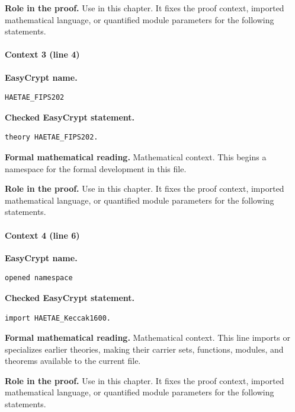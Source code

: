 \noindent\textbf{Role in the proof.}
Use in this chapter. It fixes the proof context, imported mathematical language, or quantified module parameters for the following statements.

\paragraph{Context 3 (line 4)}
\noindent\textbf{EasyCrypt name.}
\begin{lstlisting}[language=EasyCrypt,basicstyle=\ttfamily\scriptsize]
HAETAE_FIPS202
\end{lstlisting}
\noindent\textbf{Checked EasyCrypt statement.}
\begin{lstlisting}[language=EasyCrypt,basicstyle=\ttfamily\scriptsize]
theory HAETAE_FIPS202.
\end{lstlisting}
\noindent\textbf{Formal mathematical reading.}
Mathematical context. This begins a namespace for the formal development in this file.

\noindent\textbf{Role in the proof.}
Use in this chapter. It fixes the proof context, imported mathematical language, or quantified module parameters for the following statements.

\paragraph{Context 4 (line 6)}
\noindent\textbf{EasyCrypt name.}
\begin{lstlisting}[language=EasyCrypt,basicstyle=\ttfamily\scriptsize]
opened namespace
\end{lstlisting}
\noindent\textbf{Checked EasyCrypt statement.}
\begin{lstlisting}[language=EasyCrypt,basicstyle=\ttfamily\scriptsize]
import HAETAE_Keccak1600.
\end{lstlisting}
\noindent\textbf{Formal mathematical reading.}
Mathematical context. This line imports or specializes earlier theories, making their carrier sets, functions, modules, and theorems available to the current file.

\noindent\textbf{Role in the proof.}
Use in this chapter. It fixes the proof context, imported mathematical language, or quantified module parameters for the following statements.

